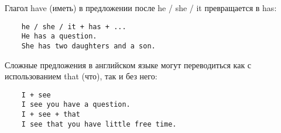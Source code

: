 Глагол have (иметь) в предложении после he / she / it превращается в has:
\begin{verbatim}
    he / she / it + has + ...
    He has a question.
    She has two daughters and a son.
\end{verbatim}

Сложные предложения в английском языке могут переводиться как с использованием that (что), так и без него:
\begin{verbatim}
    I + see
    I see you have a question.
    I + see + that
    I see that you have little free time.
\end{verbatim}